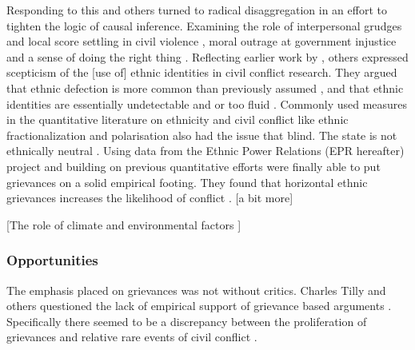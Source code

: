 Responding to this \citet{Kalyvas2006} and others turned to radical
disaggregation in an effort to tighten the logic of causal inference. Examining
the role of interpersonal grudges and local score settling in civil violence
\citep{Kalyvas2006, Kalyvas_2008}, moral outrage at government injustice and a
sense of doing the right thing \citep{Wood2003}. Reflecting earlier work by
\citet{barth1969}, others expressed scepticism of the [use of] ethnic identities
in civil conflict research. They argued that ethnic defection is more common
than previously assumed \citep{Kalyvas_2008, Staniland_2012}, and that ethnic
identities are essentially undetectable and or too fluid \citep{Gilley_2004,
Chandra2006}. Commonly used measures in the quantitative literature on ethnicity
and civil conflict like ethnic fractionalization \citep{Alesina2003,
Posner2004} and polarisation \citep{Montalvo2005} also had the issue that 
blind. The state is not ethnically neutral \citep{CedermanLars-Erik2013Igac}.
Using data from the Ethnic Power Relations (EPR hereafter) project
\citet{CedermanLars-Erik2013Igac} and building on previous quantitative efforts
\citep{Gurr_1993, Goldstone_2010} were finally able to put grievances on a solid
empirical footing. They found that horizontal ethnic grievances
increases the likelihood of conflict \citep{CedermanLars-Erik2013Igac}. [a bit
more]

[The role of climate and environmental factors \citep{Detges_2017,
von_Uexkull_2021}] %

\subsubsection{Opportunities} \label{Opportunities}

The emphasis placed on grievances was not without critics. Charles Tilly and
others questioned the lack of empirical support of grievance based arguments
\citep{Oberschall_1978, Brush_1996}. Specifically there seemed to be a
discrepancy between the proliferation of grievances and relative rare events of
civil conflict \citep{Snyder_1972, TillyCharles1978Fmtr, Skocpol_1979}. 

